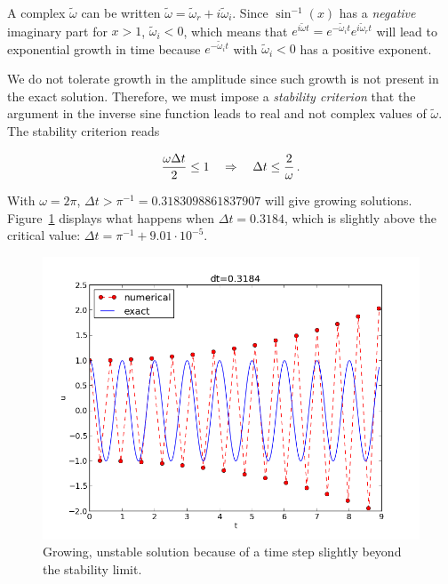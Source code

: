 \documentclass[%
oneside,                 %
final,                   %
10pt]{article}
\newenvironment{notice_mdfboxadmon}[1][]{
\begin{notice_mdfboxmdframed}[frametitle=#1]
}
{
\end{notice_mdfboxmdframed}
}
\begin{document}
A complex $\tilde\omega$ can be written $\tilde\omega = \tilde\omega_r +
i\tilde\omega_i$. Since $\sin^{-1}(x)$ has a \emph{negative} imaginary part for
$x>1$, $\tilde\omega_i < 0$, which means that
$e^{i\tilde\omega t}=e^{-\tilde\omega_i t}e^{i\tilde\omega_r t}$
will lead to exponential growth in time because
$e^{-\tilde\omega_i t}$ with $\tilde\omega_i <0$ has a positive
exponent.



\begin{notice_mdfboxadmon}
We do not tolerate growth in the amplitude since such growth is not
present in the exact solution. Therefore, we
must impose a \emph{stability criterion}  that
the argument in the inverse sine function leads
to real and not complex values of $\tilde\omega$. The stability
criterion reads

\begin{equation}
\frac{\omega\Delta t}{2} \leq 1\quad\Rightarrow\quad
\Delta t \leq \frac{2}{\omega}
\tp
\end{equation}
\end{notice_mdfboxadmon}



With $\omega =2\pi$, $\Delta t > \pi^{-1} = 0.3183098861837907$ will give
growing solutions. Figure~\ref{vib:ode1:dt:unstable}
displays what happens when $\Delta t =0.3184$,
which is slightly above the critical value: $\Delta t =\pi^{-1} + 9.01\cdot
10^{-5}$.


\begin{figure}[!ht]  %
  \centerline{\includegraphics[width=0.9\linewidth]{fig-vib/vib_unstable.png}}
  \caption{
  Growing, unstable solution because of a time step slightly beyond the stability limit. \label{vib:ode1:dt:unstable}
  }
\end{figure}
\end{document}
